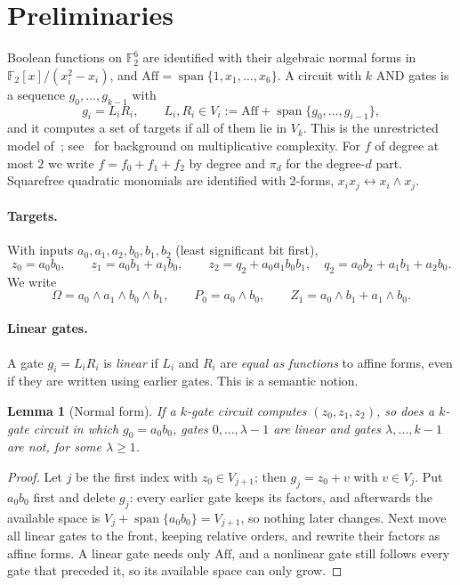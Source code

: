 \documentclass[11pt,a4paper]{article}
\theoremstyle{plain}
\newtheorem{lemma}[theorem]{Lemma}
\theoremstyle{remark}
\newcommand{\F}{\mathbb F_2}
\newcommand{\Aff}{\mathrm{Aff}}
\newcommand{\Span}{\operatorname{span}}
\begin{document}
\section{Preliminaries}\label{sec:preliminaries}

Boolean functions on $\F^6$ are identified with their algebraic normal forms in $\F[x]/(x_i^2-x_i)$, and $\Aff=\Span\{1,x_1,\dots,x_6\}$. A circuit with $k$ AND gates is a sequence $g_0,\dots,g_{k-1}$ with
\[
  g_i=L_iR_i,\qquad L_i,R_i\in V_i:=\Aff+\Span\{g_0,\dots,g_{i-1}\},
\]
and it computes a set of targets if all of them lie in $V_k$. This is the unrestricted model of~\cite{morse}; see~\cite{bpp,bf,schnorr} for background on multiplicative complexity. For $f$ of degree at most $2$ we write $f=f_0+f_1+f_2$ by degree and $\pi_d$ for the degree-$d$ part. Squarefree quadratic monomials are identified with 2-forms, $x_ix_j\leftrightarrow x_i\wedge x_j$.

\paragraph{Targets.}
With inputs $a_0,a_1,a_2,b_0,b_1,b_2$ (least significant bit first),
\[
  z_0=a_0b_0,\qquad z_1=a_0b_1+a_1b_0,\qquad z_2=q_2+a_0a_1b_0b_1,\quad q_2=a_0b_2+a_1b_1+a_2b_0 .
\]
We write
\[
  \Omega=a_0\wedge a_1\wedge b_0\wedge b_1,\qquad P_0=a_0\wedge b_0,\qquad Z_1=a_0\wedge b_1+a_1\wedge b_0 .
\]

\paragraph{Linear gates.}
A gate $g_i=L_iR_i$ is \emph{linear} if $L_i$ and $R_i$ are \emph{equal as functions} to affine forms, even if they are written using earlier gates. This is a semantic notion.

\begin{lemma}[Normal form]\label{l4:lem:normal}
If a $k$-gate circuit computes $(z_0,z_1,z_2)$, so does a $k$-gate circuit in which $g_0=a_0b_0$, gates $0,\dots,\lambda-1$ are linear and gates $\lambda,\dots,k-1$ are not, for some $\lambda\ge1$.
\end{lemma}

\begin{proof}
Let $j$ be the first index with $z_0\in V_{j+1}$; then $g_j=z_0+v$ with $v\in V_j$. Put $a_0b_0$ first and delete $g_j$: every earlier gate keeps its factors, and afterwards the available space is $V_j+\Span\{a_0b_0\}=V_{j+1}$, so nothing later changes. Next move all linear gates to the front, keeping relative orders, and rewrite their factors as affine forms. A linear gate needs only $\Aff$, and a nonlinear gate still follows every gate that preceded it, so its available space can only grow.
\end{proof}
\end{document}
